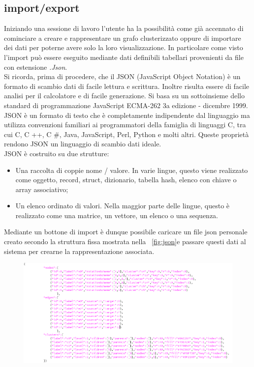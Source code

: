 {\subsection{import/export}
Iniziando una sessione di lavoro l'utente ha la possibilità come già accennato di cominciare a creare e rappresentare un grafo clusterizzato oppure di importare dei dati per poterne avere solo la loro visualizzazione. In particolare come visto l'import può essere eseguito mediante dati definibili tabellari provenienti da file con estensione \textit{.Json}.\\
Si ricorda, prima di procedere, che il JSON (JavaScript Object Notation) è un formato di scambio dati di facile lettura e scrittura. Inoltre risulta essere di facile analisi per il calcolatore e di facile generazione. Si basa su un sottoinsieme dello standard di programmazione JavaScript ECMA-262 3a edizione - dicembre 1999. JSON è un formato di testo che è completamente indipendente dal linguaggio ma utilizza convenzioni familiari ai programmatori della famiglia di linguaggi C, tra cui C, C ++, C \#, Java, JavaScript, Perl, Python e molti altri. Queste proprietà rendono JSON un linguaggio di scambio dati ideale.\\
JSON è costruito su due strutture:
\begin{itemize}
	\item Una raccolta di coppie nome / valore. In varie lingue, questo viene realizzato come oggetto, record, struct, dizionario, tabella hash, elenco con chiave o array associativo;
	\item Un elenco ordinato di valori. Nella maggior parte delle lingue, questo è realizzato come una matrice, un vettore, un elenco o una sequenza. 
\end{itemize} 
Mediante un bottone di import è dunque possibile caricare un file json personale creato secondo la struttura fissa mostrata nella \figurename~\ref{fig:json}e passare questi dati al sistema per crearne la rappresentazione associata.\\
\begin{figure}[!htb]
	\begin{center}
		\includegraphics[width=1 \linewidth]{figure/json}

\end{center}
\end{figure}}
